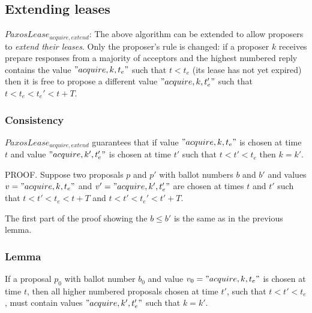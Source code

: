 \documentclass[12pt]{article}
\begin{document}
\subsection{ Extending leases }

$PaxosLease_{acquire, extend}$: The above algorithm can be extended to allow proposers to \emph{extend their leases}. Only the proposer's rule is changed: if a proposer $k$ receives prepare responses from a majority of acceptors and the highest numbered reply contains the value $"acquire, k, t_e"$ such that $t < t_e$ (its lease has not yet expired) then it is free to propose a different value $"acquire, k, t_e'"$ such that $t < t_e < t_e' < t + T$.

\subsubsection{ Consistency } $PaxosLease_{acquire, extend}$ guarantees that if value $"acquire, k, t_e"$ is chosen at time $t$ and value $"acquire, k', t_e'"$ is chosen at time $t'$ such that $t < t' < t_e$ then $k = k'$.

PROOF. Suppose two proposals $p$ and $p'$ with ballot numbers $b$ and $b'$ and values $v = "acquire, k, t_e"$ and $v' = "acquire, k', t_e'"$ are chosen at times $t$ and $t'$ such that $t < t' < t_e < t + T$ and $t < t' < t_e' < t' + T$.

The first part of the proof showing the $b \leq b'$ is the same as in the previous lemma.



\subsubsection{ Lemma } If a proposal $p_0$ with ballot number $b_0$ and value $v_0 = "acquire, k, t_e"$ is chosen at time $t$, then all higher numbered proposals chosen at time $t'$, such that $t < t' < t_e$, must contain values $"acquire, k', t_e'"$ such that $k = k'$.
\end{document}
